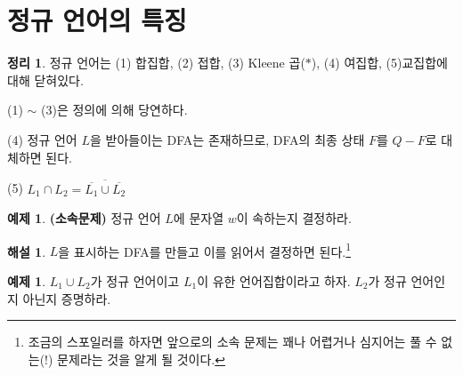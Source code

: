 \documentclass[b5paper, 11pt]{book}
\theoremstyle{definition}
\newtheorem{thm}[defn]{정리}
\newtheorem{ex}[defn]{예제}
\newtheorem*{ans*}{해설}
\newenvironment{pf*}{\pushQED{\qed}\pf}
{\popQED\endpf}
\begin{document}
\section{정규 언어의 특징}
\begin{thm}\label{RE feature}
정규 언어는 (1) 합집합, (2) 접합, (3) Kleene 곱($*$), (4) 여집합, (5)교집합에
대해 닫혀있다.
\end{thm}
\begin{pf*}
    (1) $\sim$ (3)은 정의에 의해 당연하다.

(4) 정규 언어 $L$을 받아들이는 DFA는 존재하므로, DFA의 최종 상태 $F$를
$Q-F$로 대체하면 된다.

(5) $L_1 \cap L_2  = \overline{\overline{L_1} \cup \overline{L_2}}$
\end{pf*} 
\begin{ex}
    \textbf{(소속문제)} 정규 언어 $L$에 문자열 $w$이 속하는지 결정하라. 
\end{ex} 
\begin{ans*}
$L$을 표시하는 DFA를 만들고 이를 읽어서 결정하면 된다.\footnote{ 조금의 스포일러를 하자면 앞으로의 소속 문제는 꽤나 어렵거나 심지어는 풀 수 없는(!) 문제라는 것을 알게 될 것이다.}
\end{ans*}
\begin{ex}
    $L_1 \cup L_2$가 정규 언어이고 $L_1$이 유한 언어집합이라고 하자. $L_2$가
    정규 언어인지 아닌지 증명하라. 
\end{ex}
\end{document}
